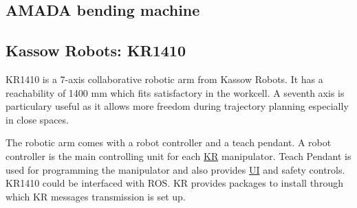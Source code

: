 \subsection{AMADA bending machine}


\subsection{Kassow Robots: KR1410}

KR1410 is a 7-axis collaborative robotic arm from Kassow Robots. It has a reachability of 1400 mm which fits
satisfactory in the workcell. A seventh axis is particulary useful as it allows more freedom during trajectory planning
especially in close spaces.

The robotic arm comes with a robot controller and a teach pendant. A robot controller is the main controlling unit for each \hyperref[acro:KR]{KR} manipulator.
Teach Pendant is used for programming the manipulator and also provides \hyperref[acro:UI]{UI} and safety controls.
KR1410 could be interfaced with ROS. KR provides packages to install through which KR messages transmission is set up.

